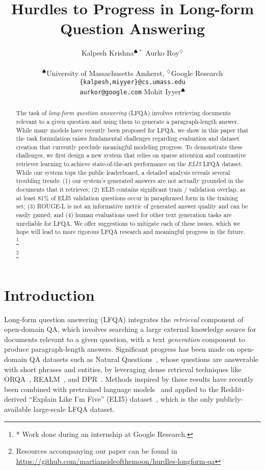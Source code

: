 \documentclass[11pt]{article}
\title{Hurdles to Progress in Long-form Question Answering}
\author{Kalpesh Krishna$^{\spadesuit\,*}$ \And Aurko Roy$^\diamondsuit$ \\\\ $^\spadesuit$University of Massachusetts Amherst, $^\diamondsuit$Google Research \\ \texttt{\{kalpesh,miyyer\}@cs.umass.edu}\\ \texttt{aurkor@google.com} \And Mohit Iyyer$^\spadesuit$}
\newcommand\blfootnote[1]{\begingroup
  \renewcommand\thefootnote{}\footnote{#1}\addtocounter{footnote}{-1}\endgroup
}
\begin{document}
\maketitle
\begin{abstract}

The task of \emph{long-form question answering} (LFQA) involves retrieving documents relevant to a given question and using them to generate a paragraph-length answer. While many models have recently been proposed for LFQA, we show in this paper that the task formulation raises fundamental challenges regarding evaluation and dataset creation that currently preclude meaningful modeling progress. To demonstrate these challenges, we first design a new system that relies on sparse attention and
contrastive retriever learning to achieve state-of-the-art performance on the \emph{ELI5} LFQA dataset. While our system tops the public leaderboard, a detailed analysis reveals several troubling trends: (1) our system's generated answers are not actually grounded in the documents that it retrieves; (2) ELI5 contains significant train / validation overlap, as at least 81\% of ELI5 validation questions occur in paraphrased form in the training set; (3) ROUGE-L is not an informative metric of generated answer quality and can be easily gamed; and (4) human evaluations used for other text generation tasks are unreliable for LFQA. We offer suggestions to mitigate each of these issues, which we hope will lead to more rigorous LFQA research and meaningful progress in the future.\blfootnote{* Work done during an internship at Google Research.}\footnote{Resources accompanying our paper can be found in \url{https://github.com/martiansideofthemoon/hurdles-longform-qa}}

\end{abstract} \section{Introduction}

Long-form question answering (LFQA) integrates the \emph{retrieval} component of open-domain QA, which involves searching a large external knowledge source for documents relevant to a given question, with a text \emph{generation} component to produce paragraph-length answers. Significant progress has been made on open-domain QA datasets such as Natural Questions~\citep{kwiatkowski2019natural}, whose questions are answerable with short phrases and entities, by leveraging dense retrieval techniques like ORQA~\citep{lee-etal-2019-latent}, REALM~\citep{guu2020realm}, and DPR~\citep{karpukhin2020dense,lewis2020retrieval,izacard2020leveraging}. Methods inspired by these results have recently been combined with pretrained language models~\citep{lewis2019bart,petroni2020kilt} and applied to the Reddit-derived ``Explain Like I'm Five'' (ELI5) dataset~\citep{fan-etal-2019-eli5}, which is the only publicly-available large-scale LFQA dataset.
\end{document}

